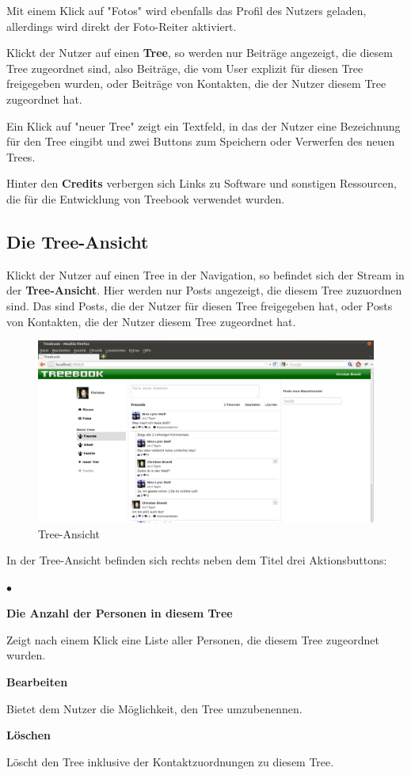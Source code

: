 \documentclass[10pt,a4paper]{book}
\makeatletter
\def\ScaleIfNeeded{%
\ifdim\Gin@nat@width>\linewidth
\linewidth
\else
\Gin@nat@width
\fi
}
\makeatother
\begin{document}
Mit einem Klick auf "Fotos" wird ebenfalls das Profil des Nutzers geladen, allerdings wird direkt der Foto-Reiter aktiviert.

Klickt der Nutzer auf einen \textbf{Tree}, so werden nur Beiträge angezeigt, die diesem Tree zugeordnet sind, also Beiträge, die vom User explizit für diesen Tree freigegeben wurden, oder Beiträge von Kontakten, die der Nutzer diesem Tree zugeordnet hat.

Ein Klick auf "neuer Tree" zeigt ein Textfeld, in das der Nutzer eine Bezeichnung für den Tree eingibt und zwei Buttons zum Speichern oder Verwerfen des neuen Trees.

Hinter den \textbf{Credits} verbergen sich Links zu Software und sonstigen Ressourcen, die für die Entwicklung von Treebook verwendet wurden.

\subsection{Die Tree-Ansicht}
Klickt der Nutzer auf einen Tree in der Navigation, so befindet sich der Stream in der \textbf{Tree-Ansicht}. Hier werden nur Posts angezeigt, die diesem Tree zuzuordnen sind. Das sind Posts, die der Nutzer für diesen Tree freigegeben hat, oder Posts von Kontakten, die der Nutzer diesem Tree zugeordnet hat.
\begin{figure}[htbp]
\centering
\includegraphics[width=\ScaleIfNeeded]{Pictures/screen_treeview.png}%
\caption{Tree-Ansicht}%
\end{figure}
In der Tree-Ansicht befinden sich rechts neben dem Titel drei Aktionsbuttons:
\begin{list}{$\bullet$}{}
\item \textbf{Die Anzahl der Personen in diesem Tree}

Zeigt nach einem Klick eine Liste aller Personen, die diesem Tree zugeordnet wurden.
\item \textbf{Bearbeiten}

Bietet dem Nutzer die Möglichkeit, den Tree umzubenennen.
\item \textbf{Löschen}

Löscht den Tree inklusive der Kontaktzuordnungen zu diesem Tree.
\end{list}
\end{document}
